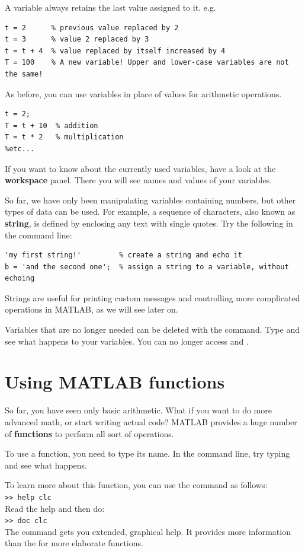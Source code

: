 \documentclass{article}
\begin{document}
A variable always retains the last value assigned to it. e.g.
\begin{lstlisting}
t = 2      % previous value replaced by 2
t = 3      % value 2 replaced by 3
t = t + 4  % value replaced by itself increased by 4
T = 100    % A new variable! Upper and lower-case variables are not the same!
\end{lstlisting}

As before, you can use variables in place of values for arithmetic operations.
\begin{lstlisting}
t = 2;
T = t + 10  % addition
T = t * 2   % multiplication
%etc...
\end{lstlisting}

If you want to know about the currently used variables, have a look at the \textbf{workspace} panel.
There you will see names and values of your variables.

So far, we have only been manipulating variables containing numbers, but other types of data can be used.
For example, a sequence of characters, also known as \textbf{string}, is defined by enclosing any text with single quotes.
Try the following in the command line:
\begin{lstlisting}
'my first string!'         % create a string and echo it
b = 'and the second one';  % assign a string to a variable, without echoing
\end{lstlisting}
Strings are useful for printing custom messages and controlling more complicated operations in MATLAB, as we will see later on.

Variables that are no longer needed can be deleted with the  command.
Type  and see what happens to your variables. You can no longer access
 and .


\pagebreak
\section{Using MATLAB functions}

So far, you have seen only basic arithmetic.
What if you want to do more advanced math, or start writing actual code?
MATLAB provides a huge number of \textbf{functions} to perform all sort of operations.

To use a function, you need to type its name.
In the command line, try typing  and see what happens.

To learn more about this function, you can use the  command as follows:\\
\verb|>> help clc|\\
Read the help and then do:\\
\verb|>> doc clc|\\
The  command gets you extended, graphical help. It provides more information than the  for more elaborate functions.
\end{document}

